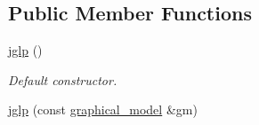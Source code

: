 \subsection*{Public Member Functions}
\begin{DoxyCompactItemize}
\item 
\hypertarget{classmerlin_1_1jglp_aa6fa80d5245138810714337e621567f7}{}\hyperlink{classmerlin_1_1jglp_aa6fa80d5245138810714337e621567f7}{jglp} ()\label{classmerlin_1_1jglp_aa6fa80d5245138810714337e621567f7}

\begin{DoxyCompactList}\small\item\em Default constructor. \end{DoxyCompactList}\item 
\hypertarget{classmerlin_1_1jglp_ad3b225e0288d9a911a5e8badcbc53e73}{}\hyperlink{classmerlin_1_1jglp_ad3b225e0288d9a911a5e8badcbc53e73}{jglp} (const \hyperlink{classmerlin_1_1graphical__model}{graphical\+\_\+model} \&gm)\label{classmerlin_1_1jglp_ad3b225e0288d9a911a5e8badcbc53e73}


\end{DoxyCompactItemize}
